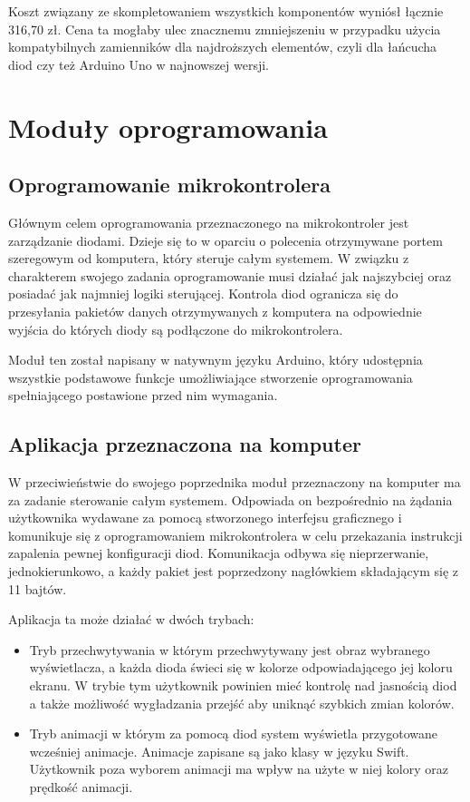 \documentclass[12pt]{report}
\begin{document}
Koszt związany ze skompletowaniem wszystkich komponentów wyniósł łącznie 316,70 zł. Cena ta mogłaby ulec znacznemu zmniejszeniu w przypadku użycia kompatybilnych zamienników dla najdroższych elementów, czyli dla łańcucha diod czy też Arduino Uno w najnowszej wersji.


\section{Moduły oprogramowania}

\subsection{Oprogramowanie mikrokontrolera}

Głównym celem oprogramowania przeznaczonego na mikrokontroler jest zarządza\-nie diodami. Dzieje się to w oparciu o polecenia otrzymywane portem szeregowym od komputera, który steruje całym systemem. W związku z charakterem swojego zadania oprogramowanie musi działać jak najszybciej oraz posiadać jak najmniej logiki sterującej. Kontrola diod ogranicza się do przesyłania pakietów danych otrzymywanych z komputera na odpowiednie wyjścia do których diody są podłączone do mikrokontrolera. 

Moduł ten został napisany w natywnym języku Arduino, który udostępnia wszystkie podstawowe funkcje umożliwiające stworzenie oprogramowania spełniającego postawione przed nim wymagania.

\subsection{Aplikacja przeznaczona na komputer}

W przeciwieństwie do swojego poprzednika moduł przeznaczony na komputer ma za zadanie sterowanie całym systemem. Odpowiada on bezpośrednio na żądania użytkownika wydawane za pomocą stworzonego interfejsu graficznego i komunikuje się z oprogramowaniem mikrokontrolera w celu przekazania instrukcji zapalenia pewnej konfiguracji diod. Komunikacja odbywa się nieprzerwanie, jednokierunkowo, a każdy pakiet jest poprzedzony nagłówkiem składającym się z 11 bajtów.

Aplikacja ta może działać w dwóch trybach:

\begin{itemize}
	\item Tryb przechwytywania w którym przechwytywany jest obraz wybranego wyświetlacza, a każda dioda świeci się w kolorze odpowiadającego jej koloru ekranu. W trybie tym użytkownik powinien mieć kontrolę nad jasnością diod a także możliwość wygładzania przejść aby uniknąć szybkich zmian kolorów.
	\item Tryb animacji w którym za pomocą diod system wyświetla przygotowane wcześniej animacje. Animacje zapisane są jako klasy w języku Swift. Użytkownik poza wyborem animacji ma wpływ na użyte w niej kolory oraz prędkość animacji.
\end{itemize}
\end{document}
